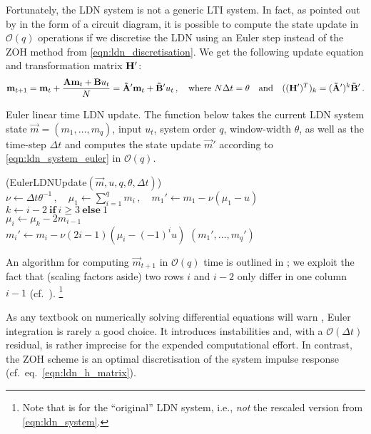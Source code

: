 Fortunately, the LDN system is not a generic LTI system.
In fact, as pointed out by \citet[Figure~6.6]{voelker2019} in the form of a circuit diagram, it is possible to compute the state update in $\mathcal{O}(q)$ operations if we discretise the LDN using an Euler step instead of the ZOH method from \cref{eqn:ldn_discretisation}.
We get the following update equation and transformation matrix $\mathbf{H}'$:%
\begin{align}
	\mathbf{m}_{t + 1} = \mathbf{m}_{t} + \frac{\mathbf{A} \mathbf{m}_{t} + \mathbf{B} u_t}{N} = \mathbf{\tilde A}' \mathbf{m}_t + \mathbf{\tilde B}' u_t \,,
	\quad \text{where } N \Delta t = \theta
	\quad \text{and} \quad
	((\mathbf{H}')^T)_k = (\mathbf{\tilde A}')^k \mathbf{\tilde B}' \,.
	\label{eqn:ldn_system_euler}
\end{align}
\begin{algorithm}[t]
	\begin{minipage}{0.98\textwidth}
	\caption[Euler linear time LDN update]{Euler linear time LDN update. The function below takes the current LDN system state $\vec m = (m_1, \ldots, m_q)$, input $u_t$, system order $q$, window-width $\theta$, as well as the time-step $\Delta t$ and computes the state update $\vec m'$ according to \cref{eqn:ldn_system_euler} in $\mathcal{O}(q)$.
	}
	\label{alg:ldn_euler}
	\end{minipage}
	\sffamily\small
	\Begin(EulerLDNUpdate${(\vec m, u, q, \theta, \Delta t)}$)
	{
		$\nu \gets \Delta t \theta^{-1} \,, \quad \mu_1 \gets \sum\nolimits_{i = 1}^q m_i \,, \quad m_1' \gets m_1 - \nu (\mu_1 - u)$ \\
		{
			$k \gets i - 2~\mathbf{if}~i \geq 3~\mathbf{else}~1$\\
			$\mu_i \gets \mu_k - 2 m_{i - 1}$ \\
			$m_i' \gets m_i - \nu (2i - 1)  (\mu_i - (-1)^i u)$
		}
		\Return $(m_1', \ldots, m_q')$
	}
\end{algorithm}%
An algorithm for computing $\vec m_{t + 1}$ in $\mathcal{O}(q)$ time is outlined in ; we exploit the fact that (scaling factors aside) two rows $i$ and $i - 2$ only differ in one column $i - 1$ (cf.~).%
\footnote{Note that  is for the \enquote{original} LDN system, i.e., \emph{not} the rescaled version from \cref{eqn:ldn_system}.}

As any textbook on numerically solving differential equations will warn \citep[e.g.,][Chapter~17.1]{press2007numerical}, Euler integration is rarely a good choice.
It introduces instabilities and, with a $\mathcal{O}(\Delta t)$ residual, is rather imprecise for the expended computational effort.
In contrast, the ZOH scheme is an optimal discretisation of the system impulse response (cf.~eq.~\ref{eqn:ldn_h_matrix}).

